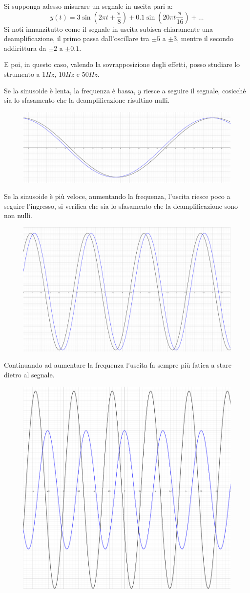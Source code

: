 \documentclass[a4paper, 15pt]{article}
\begin{document}
\begin{adjustwidth}{2in}{}
	Si supponga adesso misurare un segnale in uscita pari a: 
	\[y(t) = 3\sin\left(2\pi t + \dfrac{\pi}{8}\right) + 0.1\sin\left(20\pi t \dfrac{\pi}{16}\right) + \dots  \]
	Si noti innanzitutto come il segnale in uscita subisca chiaramente una deamplificazione, il primo passa dall'oscillare tra $\pm 5$  a $\pm 3$, mentre il secondo addirittura da $\pm 2$ a $\pm 0.1$. 
	
	E poi, in questo caso, valendo la sovrapposizione degli effetti, posso studiare lo strumento a $1Hz$, $10Hz$ e $50Hz$. \newline 
	
	Se la sinusoide è lenta, la frequenza è bassa, $y$ riesce a seguire il segnale, cosicché sia lo sfasamento che la deamplificazione risultino nulli.  	
\begin{figure}[H]
	\centering
	\includegraphics[width=0.5\linewidth]{fig/bassafreq}
	\label{fig:bassafreq}
\end{figure}

\newpage

	Se la sinusoide è più veloce, aumentando la frequenza, l'uscita riesce poco a seguire l'ingresso, si verifica che sia lo sfasamento che la deamplificazione sono non nulli. 	
\begin{figure}[H]
	\centering
	\includegraphics[width=0.3\linewidth]{fig/bassafreq1}
	\label{fig:bassafreq1}
\end{figure}

	Continuando ad aumentare la frequenza l'uscita fa sempre più fatica a stare dietro al segnale. 	
\begin{figure}[H]
	\centering
	\includegraphics[width=0.3\linewidth]{fig/bassafreq2}
	\label{fig:bassafreq2}
\end{figure}


\end{adjustwidth}
\end{document}
